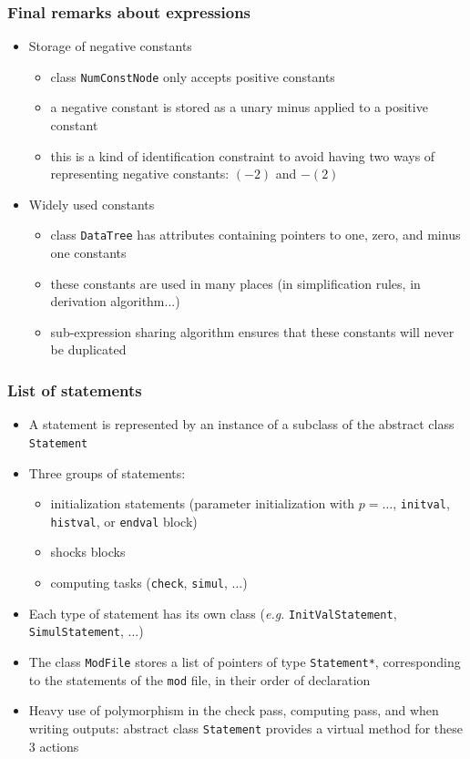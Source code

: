 \documentclass{beamer}
\begin{document}
\begin{frame}
  \frametitle{Final remarks about expressions}
  \begin{itemize}
  \item Storage of negative constants
    \begin{itemize}
    \item class \texttt{NumConstNode} only accepts positive constants
    \item a negative constant is stored as a unary minus applied to a positive constant
    \item this is a kind of identification constraint to avoid having two ways of representing negative constants: $(-2)$ and $-(2)$
    \end{itemize}
  \item Widely used constants
    \begin{itemize}
    \item class \texttt{DataTree} has attributes containing pointers to one, zero, and minus one constants
    \item these constants are used in many places (in simplification rules, in derivation algorithm...)
    \item sub-expression sharing algorithm ensures that these constants will never be duplicated
    \end{itemize}
  \end{itemize}
\end{frame}

\begin{frame}
  \frametitle{List of statements}
  \begin{itemize}
  \item A statement is represented by an instance of a subclass of the abstract class \texttt{Statement}
  \item Three groups of statements:
    \begin{itemize}
    \item initialization statements (parameter initialization with $p = \ldots$, \texttt{initval}, \texttt{histval}, or \texttt{endval} block)
    \item shocks blocks
    \item computing tasks (\texttt{check}, \texttt{simul}, ...)
    \end{itemize}
  \item Each type of statement has its own class (\textit{e.g.} \texttt{InitValStatement}, \texttt{SimulStatement}, ...)
  \item The class \texttt{ModFile} stores a list of pointers of type \texttt{Statement*}, corresponding to the statements of the \texttt{mod} file, in their order of declaration
  \item Heavy use of polymorphism in the check pass, computing pass, and when writing outputs: abstract class \texttt{Statement} provides a virtual method for these 3 actions
  \end{itemize}
\end{frame}
\end{document}

